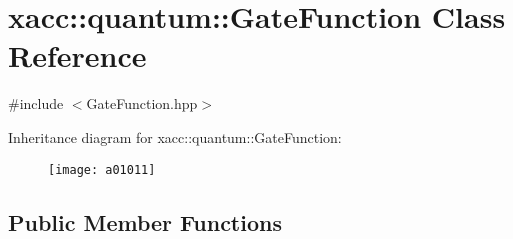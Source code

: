 \hypertarget{a01011}{}\section{xacc\+:\+:quantum\+:\+:Gate\+Function Class Reference}
\label{a01011}


{\ttfamily \#include $<$Gate\+Function.\+hpp$>$}

Inheritance diagram for xacc\+:\+:quantum\+:\+:Gate\+Function\+:\begin{figure}[H]
\begin{center}
\leavevmode
\texttt{[image: a01011]}
\end{center}
\end{figure}
\subsection*{Public Member Functions}
